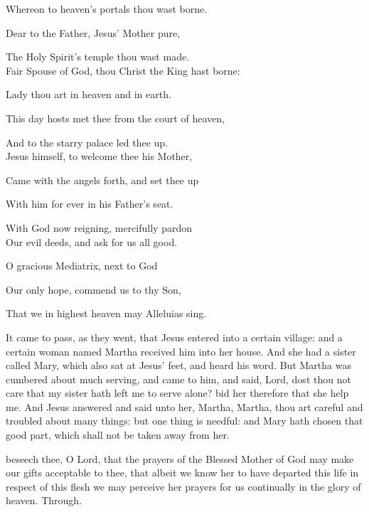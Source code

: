 \begin{multicols}{2}
Whereon to heaven's portals thou wast borne.

Dear to the Father, Jesus' Mother pure,

The Holy Spirit's temple thou wast made.\\

Fair Spouse of God, thou Christ the King hast borne:

Lady thou art in heaven and in earth.

This day hosts met thee from the court of heaven,

And to the starry palace led thee up.\\

Jesus himself, to welcome thee his Mother,

Came with the angels forth, and set thee up

With him for ever in his Father's seat.

With God now reigning, mercifully pardon\\

Our evil deeds, and ask for us all good.

O gracious Mediatrix, next to God

Our only hope, commend us to thy Son,

That we in highest heaven may Alleluias sing.
\end{multicols}

\vspace{-2.5ex}

 It came to pass, as they went, that Jesus entered into a certain village: and a certain woman named Martha received him into her house. And she had a sister called Mary, which also sat at Jesus' feet, and heard his word. But Martha was cumbered about much serving, and came to him, and said, Lord, dost thou not care that my sister hath left me to serve alone? bid her therefore that she help me. And Jesus answered and said unto her, Martha, Martha, thou art careful and troubled about many things: but one thing is needful: and Mary hath chosen that good part, which shall not be taken away from her.


\vspace{-1.5ex}

\secret
{} beseech thee, O Lord, that the prayers of the Blessed Mother of God may make our gifts acceptable to thee, that albeit we know her to have departed this life in respect of this flesh we may perceive her prayers for us continually in the glory of heaven. Through.

